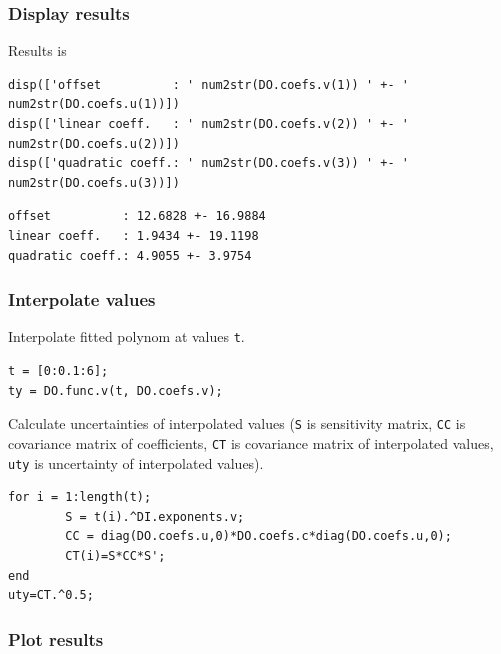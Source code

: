 {}
\subsubsection*{Display results}



Results is

\begin{lstlisting}
disp(['offset          : ' num2str(DO.coefs.v(1)) ' +- ' num2str(DO.coefs.u(1))])
disp(['linear coeff.   : ' num2str(DO.coefs.v(2)) ' +- ' num2str(DO.coefs.u(2))])
disp(['quadratic coeff.: ' num2str(DO.coefs.v(3)) ' +- ' num2str(DO.coefs.u(3))])
\end{lstlisting}
\begin{lstlisting}[language={},xleftmargin=5pt,frame=none]
offset          : 12.6828 +- 16.9884
linear coeff.   : 1.9434 +- 19.1198
quadratic coeff.: 4.9055 +- 3.9754

\end{lstlisting}


{}
\subsubsection*{Interpolate values}



Interpolate fitted polynom at values \texttt{t}.

\begin{lstlisting}
t = [0:0.1:6];
ty = DO.func.v(t, DO.coefs.v);
\end{lstlisting}


Calculate uncertainties of interpolated values (\texttt{S} is sensitivity matrix, \texttt{CC} is covariance
matrix of coefficients, \texttt{CT} is covariance matrix of interpolated values, \texttt{uty} is uncertainty of
interpolated values).

\begin{lstlisting}
for i = 1:length(t);
        S = t(i).^DI.exponents.v;
        CC = diag(DO.coefs.u,0)*DO.coefs.c*diag(DO.coefs.u,0);
        CT(i)=S*CC*S';
end
uty=CT.^0.5;
\end{lstlisting}


{}
\subsubsection*{Plot results}

